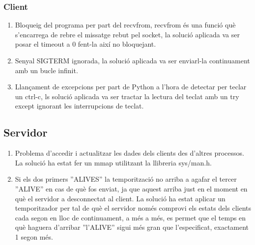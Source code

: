 \documentclass[11pt]{article}
\begin{document}
		\subsubsection*{Client}
\begin{enumerate}
\item Bloqueig del programa per part del recvfrom, recvfrom és una funció què s'encarrega de rebre el missatge rebut pel socket, la solució aplicada va ser posar el timeout a 0 fent-la així no bloquejant.
\item Senyal SIGTERM ignorada, la solució aplicada va ser enviarl-la continuament amb un bucle infinit.
\item Llançament de excepcions per part de Python a l'hora de detectar per teclar un ctrl-c, ls solució aplicada va ser tractar la lectura del teclat amb un try except ignorant les interrupcions de teclat.
\end{enumerate}
		\subsection*{Servidor}
\begin{enumerate}
\item Problema d'accedir i actualitzar les dades dels clients des d'altres processos. La solució ha estat fer un mmap utilitzant la llibreria sys/man.h.
\item Si els dos primers ''ALIVES'' la temporització no arriba a agafar el tercer ''ALIVE'' en cas de què fos enviat, ja que aquest arriba just en el moment en què el servidor a desconnectat al client. La solució ha estat aplicar un temporitzador per tal de què el servidor només comprovi els estats dels clients cada segon en lloc de continuament, a més a més, es permet que el temps en què haguera d'arribar ''l'ALIVE'' sigui més gran que l'especificat, exactament 1 segon més.
\end{enumerate}
\newpage
\end{document}
